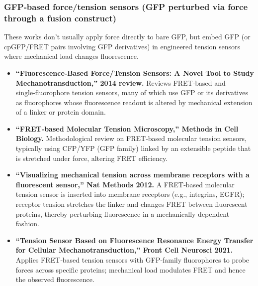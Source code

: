 \documentclass{article}
\begin{document}
\subsubsection*{GFP‑based force/tension sensors (GFP perturbed via force through a fusion construct)}

These works don't usually apply force directly to bare GFP, but embed GFP (or cpGFP/FRET pairs involving GFP derivatives) in engineered tension sensors where mechanical load changes fluorescence.

\begin{itemize}
    \item \textbf{``Fluorescence‑Based Force/Tension Sensors: A Novel Tool to Study Mechanotransduction,'' 2014 review.}
    Reviews FRET‑based and single‑fluorophore tension sensors, many of which use GFP or its derivatives as fluorophores whose fluorescence readout is altered by mechanical extension of a linker or protein domain. \href{https://pmc.ncbi.nlm.nih.gov/articles/PMC3924807/}{\textbullet}

    \item \textbf{``FRET‑based Molecular Tension Microscopy,'' Methods in Cell Biology.}
    Methodological review on FRET‑based molecular tension sensors, typically using CFP/YFP (GFP family) linked by an extensible peptide that is stretched under force, altering FRET efficiency. \href{https://www.sciencedirect.com/science/article/pii/S1046202315300268}{\textbullet}

    \item \textbf{``Visualizing mechanical tension across membrane receptors with a fluorescent sensor,'' Nat Methods 2012.}
    A FRET‑based molecular tension sensor is inserted into membrane receptors (e.g., integrins, EGFR); receptor tension stretches the linker and changes FRET between fluorescent proteins, thereby perturbing fluorescence in a mechanically dependent fashion. \href{https://www.nature.com/articles/nmeth.1747}{\textbullet}

    \item \textbf{``Tension Sensor Based on Fluorescence Resonance Energy Transfer for Cellular Mechanotransduction,'' Front Cell Neurosci 2021.}
    Applies FRET‑based tension sensors with GFP‑family fluorophores to probe forces across specific proteins; mechanical load modulates FRET and hence the observed fluorescence. \href{https://www.frontiersin.org/journals/cellular-neuroscience/articles/10.3389/fncel.2021.685044/full}{\textbullet}
\end{itemize}
\end{document}
